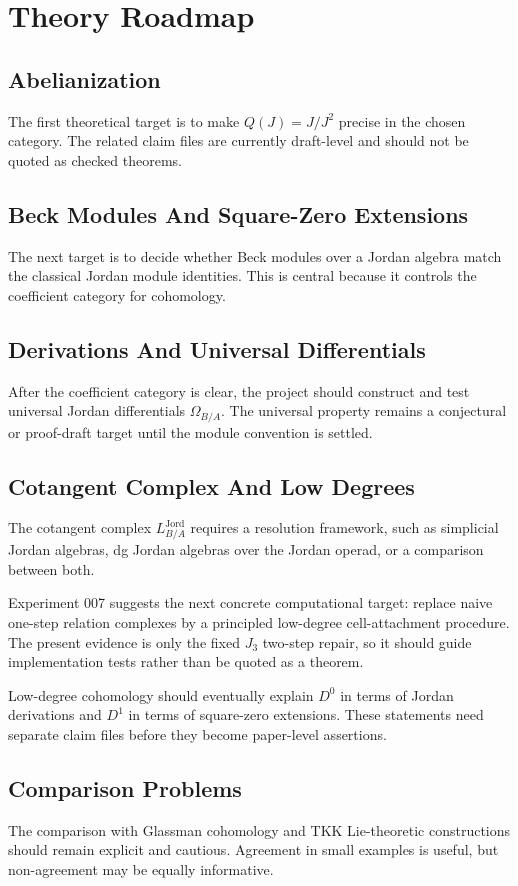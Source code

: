 \chapter{Theory Roadmap}

\section{Abelianization}

The first theoretical target is to make \(Q(J)=J/J^2\) precise in the chosen
category. The related claim files are currently draft-level and should not be
quoted as checked theorems.

\section{Beck Modules And Square-Zero Extensions}

The next target is to decide whether Beck modules over a Jordan algebra match
the classical Jordan module identities. This is central because it controls the
coefficient category for cohomology.

\section{Derivations And Universal Differentials}

After the coefficient category is clear, the project should construct and test
universal Jordan differentials \(\Omega_{B/A}\). The universal property remains
a conjectural or proof-draft target until the module convention is settled.

\section{Cotangent Complex And Low Degrees}

The cotangent complex \(L^{\mathrm{Jord}}_{B/A}\) requires a resolution
framework, such as simplicial Jordan algebras, dg Jordan algebras over the
Jordan operad, or a comparison between both.

Experiment 007 suggests the next concrete computational target: replace naive
one-step relation complexes by a principled low-degree cell-attachment
procedure. The present evidence is only the fixed \(J_3\) two-step repair, so
it should guide implementation tests rather than be quoted as a theorem.

Low-degree cohomology should eventually explain \(D^0\) in terms of Jordan
derivations and \(D^1\) in terms of square-zero extensions. These statements
need separate claim files before they become paper-level assertions.

\section{Comparison Problems}

The comparison with Glassman cohomology and TKK Lie-theoretic constructions
should remain explicit and cautious. Agreement in small examples is useful,
but non-agreement may be equally informative.
